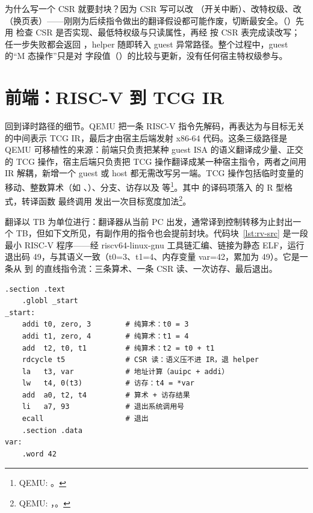 为什么写一个 CSR 就要封块？因为 CSR 写可以改 （开关中断）、改特权级、改 （换页表）——刚刚为后续指令做出的翻译假设都可能作废，切断最安全。（）先用  检查 CSR 是否实现、最低特权级与只读属性，再经  按 CSR 表完成读改写；任一步失败都会返回 ，helper 随即转入 guest 异常路径。整个过程中，guest 的“M 态操作”只是对  字段值（）的比较与更新，没有任何宿主特权级参与。

\section{前端：RISC-V 到 TCG IR}\label{sec:software-cpu-frontend}

回到译时路径的细节。QEMU 把一条 RISC-V 指令先解码，再表达为与目标无关的中间表示 TCG IR，最后才由宿主后端发射 x86-64 代码。这条三级路径是 QEMU 可移植性的来源：前端只负责把某种 guest ISA 的语义翻译成少量、正交的 TCG 操作，宿主后端只负责把 TCG 操作翻译成某一种宿主指令，两者之间用 IR 解耦，新增一个 guest 或 host 都无需改写另一端。TCG 操作包括临时变量的移动、整数算术（如 、）、分支、访存以及  等\footnote{QEMU: 。}。其中  的译码项落入  的 R 型格式，转译函数  最终调用  发出一次目标宽度加法\footnote{QEMU: ，。}。

翻译以 TB 为单位进行：翻译器从当前 PC 出发，通常译到控制转移为止封出一个 TB，但如下文所见，有副作用的指令也会提前封块。代码块~\ref{lst:rv-src} 是一段最小 RISC-V 程序——经 riscv64-linux-gnu 工具链汇编、链接为静态 ELF，运行退出码 49，与其语义一致（t0=3、t1=4、内存变量 var=42，累加为 49）。它是一条从  到  的直线指令流：三条算术、一条 CSR 读、一次访存、最后退出。

\begin{lstlisting}[caption={guest 程序源码（RISC-V 汇编，riscv64-linux-gnu as+ld 产出静态 ELF，qemu-riscv64 运行退出码 49）},label={lst:rv-src}]
    .section .text
    .globl _start
_start:
    addi t0, zero, 3        # 纯算术：t0 = 3
    addi t1, zero, 4        # 纯算术：t1 = 4
    add  t2, t0, t1         # 纯算术：t2 = t0 + t1
    rdcycle t5              # CSR 读：语义压不进 IR，退 helper
    la   t3, var            # 地址计算（auipc + addi）
    lw   t4, 0(t3)          # 访存：t4 = *var
    add  a0, t2, t4         # 算术 + 访存结果
    li   a7, 93             # 退出系统调用号
    ecall                   # 退出
    .section .data
var:
    .word 42
\end{lstlisting}

